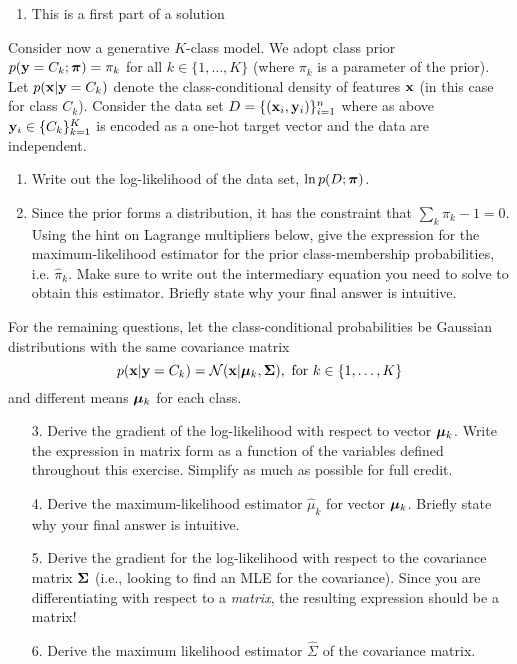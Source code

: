 \documentclass[submit]{harvardml}
\begin{document}
\begin{enumerate}

\item 

This is a first part of a solution

\end{enumerate}


\begin{problem}

  Consider now a generative $K$-class model.  We adopt class prior
  $p(\mathbf{y} = C_k; \boldsymbol{\pi}) = \pi_k$ for all $k \in \{1, \ldots, K\}$
(where $\pi_k$ is a parameter of the prior).
Let  $p(\mathbf{x}|\mathbf{y}=C_k)$ denote
the class-conditional density of features $\mathbf{x}$ (in this
case for class $C_k$). Consider the data set $D = \{(\mathbf{x}_i,
\mathbf{y}_i)\}_{i=1}^n$ where as above $\mathbf{y}_i \in \{C_k\}_{k=1}^K$ is
encoded as a one-hot target vector and the data are independent.

\begin{enumerate}
  \item Write out the log-likelihood of the data set, $\ln p(D ; \boldsymbol{\pi})$.

  \item Since the prior forms a distribution, it has the constraint that
    $\sum_k\pi_k - 1 = 0$.  Using the hint on
Lagrange multipliers below, give the
    expression for the maximum-likelihood estimator for the prior
    class-membership probabilities, i.e.
    $\hat \pi_k.$
    Make sure to write out the intermediary equation you need
    to solve to obtain this estimator. Briefly state why your final answer is intuitive.
\end{enumerate}

    For the remaining questions, let the
    class-conditional probabilities be Gaussian distributions with
the same covariance matrix
    $$p(\mathbf{x} | \mathbf{y} = C_k) = \mathcal{N}(\mathbf{x} |  \boldsymbol{\mu}_k, \mathbf{\Sigma}), \text{\ for\ }k \in \{1,\ldots, K\}$$
    and different means $\boldsymbol{\mu}_k$ for each class.

    \begin{enumerate}
  \item[3.] Derive the gradient of the log-likelihood with respect to vector $\boldsymbol{\mu}_k$.
    Write the expression in matrix form as a function of the variables defined
    throughout this exercise. Simplify as much as possible for full credit.
  \item[4.] Derive the maximum-likelihood estimator $\hat{\mu}_k$ for vector $\boldsymbol{\mu}_k$. Briefly state why your final answer is intuitive.
  \item[5.] Derive the gradient for the log-likelihood with respect to the
    covariance matrix $\mathbf{\Sigma}$ (i.e., looking
to find an MLE for the covariance).
Since you are differentiating with respect to a
    \emph{matrix}, the resulting expression should be a matrix!
%
  \item[6.] Derive the maximum likelihood estimator $\hat{\Sigma}$ of the covariance matrix.
\end{enumerate}


\end{problem}
\end{document}
